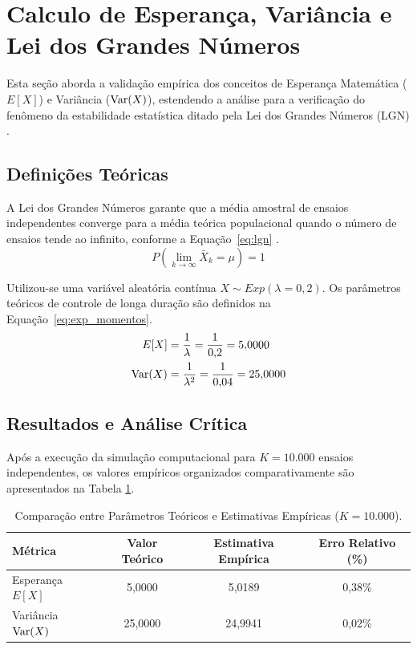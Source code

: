 \section{Calculo de Esperança, Variância e Lei dos Grandes Números}
Esta seção aborda a validação empírica dos conceitos de Esperança Matemática ($E[X]$) e Variância ($\operatorname{Var}(X)$), estendendo a análise para a verificação do fenômeno da estabilidade estatística ditado pela Lei dos Grandes Números (LGN) \cite{chan2021probability}.

\subsection{Definições Teóricas}

A Lei dos Grandes Números garante que a média amostral de ensaios independentes converge para a média teórica populacional quando o número de ensaios tende ao infinito, conforme a Equação~\ref{eq:lgn} \cite{ross2010probabilidade}.
\begin{equation}
    P\left( \lim_{k \to \infty} \bar{X}_k = \mu \right) = 1
    \label{eq:lgn}
\end{equation}

Utilizou-se uma variável aleatória contínua $X \sim Exp(\lambda = 0{,}2)$. Os parâmetros teóricos de controle de longa duração são definidos na Equação~\ref{eq:exp_momentos}.
\begin{equation}
\begin{aligned}
    E[X] &= \frac{1}{\lambda} = \frac{1}{0{,}2} = 5{,}0000 \\
    \operatorname{Var}(X) &= \frac{1}{\lambda^2} = \frac{1}{0{,}04} = 25{,}0000
\end{aligned}
\label{eq:exp_momentos}
\end{equation}

\subsection{Resultados e Análise Crítica}

Após a execução da simulação computacional para $K = 10.000$ ensaios independentes, os valores empíricos organizados comparativamente são apresentados na Tabela \ref{tab:t4_comparativo}.

\begin{table}[H]
    \centering
    \caption{Comparação entre Parâmetros Teóricos e Estimativas Empíricas ($K=10.000$).}
    \label{tab:t4_comparativo}
    \vspace{2mm}
    \begin{tabular}{lccc}
        \toprule
        \textbf{Métrica} & \textbf{Valor Teórico} & \textbf{Estimativa Empírica} & \textbf{Erro Relativo (\%)} \\ \midrule
        Esperança $E[X]$ & 5,0000 & 5,0189 & 0,38\% \\
        Variância $\operatorname{Var}(X)$ & 25,0000 & 24,9941 & 0,02\% \\ \bottomrule
    \end{tabular}
\end{table}

